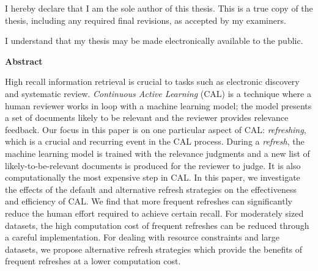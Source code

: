 \cleardoublepage %

 
  \noindent
I hereby declare that I am the sole author of this thesis. This is a true copy of the thesis, including any required final revisions, as accepted by my examiners.

  \bigskip
  
  \noindent
I understand that my thesis may be made electronically available to the public.

\cleardoublepage


\begin{center}\textbf{Abstract}\end{center}
High recall information retrieval is crucial to tasks such as electronic
discovery and systematic review. \textit{Continuous Active Learning} (CAL) is a
technique where a human reviewer works in loop with a machine learning model; the
model presents a set of documents likely to be relevant and the reviewer
provides relevance feedback. Our focus in this paper is on one particular aspect
of CAL:  \textit{refreshing}, which is a crucial and recurring event in the CAL
process.  During a \textit{refresh}, the machine learning model is trained with
the relevance judgments and a new list of likely-to-be-relevant documents is
produced for the reviewer to judge. It is also computationally the most
expensive step in CAL. In this paper, we investigate the effects of the default
and alternative refresh strategies on the effectiveness and efficiency of CAL.
We find that more frequent refreshes can significantly reduce the human effort
required to achieve certain recall. For moderately sized datasets, the high
computation cost of frequent refreshes can be reduced through a careful
implementation. For dealing with resource constraints and large datasets, we
propose alternative refresh strategies which provide the benefits of frequent
refreshes at a lower computation cost.

\cleardoublepage


